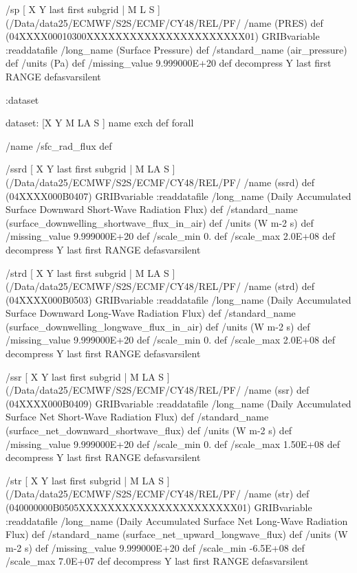 \begin{ingrid}
/sp { [ X Y last first subgrid | M L S ] (/Data/data25/ECMWF/S2S/ECMF/CY48/REL/PF/%
/name (PRES) def
(04XXXX00010300XXXXXXXXXXXXXXXXXXXXXX01) GRIBvariable
:readdatafile
/long_name (Surface Pressure) def
/standard_name (air_pressure) def
/units (Pa) def
/missing_value 9.999000E+20 def
decompress
Y last first RANGE
} defasvarsilent

:dataset

\end{ingrid}
\begin{ingrid}


dataset:
[X Y M LA S ] {name exch def } forall

/name /sfc_rad_flux def

/ssrd { [ X Y last first subgrid | M LA S ] (/Data/data25/ECMWF/S2S/ECMF/CY48/REL/PF/%
/name (ssrd) def
(04XXXX000B0407) GRIBvariable
:readdatafile
/long_name (Daily Accumulated Surface Downward Short-Wave Radiation Flux) def
/standard_name (surface_downwelling_shortwave_flux_in_air) def
/units (W m-2 s) def
/missing_value 9.999000E+20 def
/scale_min 0. def
/scale_max 2.0E+08 def
decompress
Y last first RANGE
} defasvarsilent

/strd { [ X Y last first subgrid | M LA S ] (/Data/data25/ECMWF/S2S/ECMF/CY48/REL/PF/%
/name (strd) def
(04XXXX000B0503) GRIBvariable
:readdatafile
/long_name (Daily Accumulated Surface Downward Long-Wave Radiation Flux) def
/standard_name (surface_downwelling_longwave_flux_in_air) def
/units (W m-2 s) def
/missing_value 9.999000E+20 def
/scale_min 0. def
/scale_max 2.0E+08 def
decompress
Y last first RANGE
} defasvarsilent

/ssr { [ X Y last first subgrid | M LA S ] (/Data/data25/ECMWF/S2S/ECMF/CY48/REL/PF/%
/name (ssr) def
(04XXXX000B0409) GRIBvariable
:readdatafile
/long_name (Daily Accumulated Surface Net Short-Wave Radiation Flux) def
/standard_name (surface_net_downward_shortwave_flux) def
/units (W m-2 s) def
/missing_value 9.999000E+20 def
/scale_min 0. def
/scale_max 1.50E+08 def
decompress
Y last first RANGE
} defasvarsilent

/str { [ X Y last first subgrid | M LA S ] (/Data/data25/ECMWF/S2S/ECMF/CY48/REL/PF/%
/name (str) def
(040000000B0505XXXXXXXXXXXXXXXXXXXXXX01) GRIBvariable
:readdatafile
/long_name (Daily Accumulated Surface Net Long-Wave Radiation Flux) def
/standard_name (surface_net_upward_longwave_flux) def
/units (W m-2 s) def
/missing_value 9.999000E+20 def
/scale_min -6.5E+08 def
/scale_max 7.0E+07 def
decompress
Y last first RANGE
} defasvarsilent


\end{ingrid}
